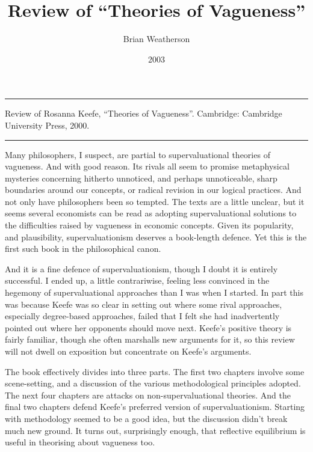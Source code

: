 \documentclass[
  10pt,
  letterpaper,
  DIV=11,
  numbers=noendperiod,
  twoside]{scrartcl}
\title{Review of ``Theories of Vagueness''}
\author{Brian Weatherson}
\date{2003}
\renewenvironment{abstract}
 {\vspace{-1.25cm}
 \quotation\small\noindent\rule{\linewidth}{.5pt}\par\smallskip
 \noindent }
 {\par\noindent\rule{\linewidth}{.5pt}\endquotation}
\begin{document}
\maketitle
\begin{abstract}
Review of Rosanna Keefe, ``Theories of Vagueness''. Cambridge: Cambridge
University Press, 2000.
\end{abstract}

Many philosophers, I suspect, are partial to supervaluational theories
of vagueness. And with good reason. Its rivals all seem to promise
metaphysical mysteries concerning hitherto unnoticed, and perhaps
unnoticeable, sharp boundaries around our concepts, or radical revision
in our logical practices. And not only have philosophers been so
tempted. The texts are a little unclear, but it seems several economists
can be read as adopting supervaluational solutions to the difficulties
raised by vagueness in economic concepts. Given its popularity, and
plausibility, supervaluationism deserves a book-length defence. Yet this
is the first such book in the philosophical canon.

And it is a fine defence of supervaluationism, though I doubt it is
entirely successful. I ended up, a little contrariwise, feeling less
convinced in the hegemony of supervaluational approaches than I was when
I started. In part this was because Keefe was so clear in setting out
where some rival approaches, especially degree-based approaches, failed
that I felt she had inadvertently pointed out where her opponents should
move next. Keefe's positive theory is fairly familiar, though she often
marshalls new arguments for it, so this review will not dwell on
exposition but concentrate on Keefe's arguments.

The book effectively divides into three parts. The first two chapters
involve some scene-setting, and a discussion of the various
methodological principles adopted. The next four chapters are attacks on
non-supervaluational theories. And the final two chapters defend Keefe's
preferred version of supervaluationism. Starting with methodology seemed
to be a good idea, but the discussion didn't break much new ground. It
turns out, surprisingly enough, that reflective equilibrium is useful in
theorising about vagueness too.
\end{document}

